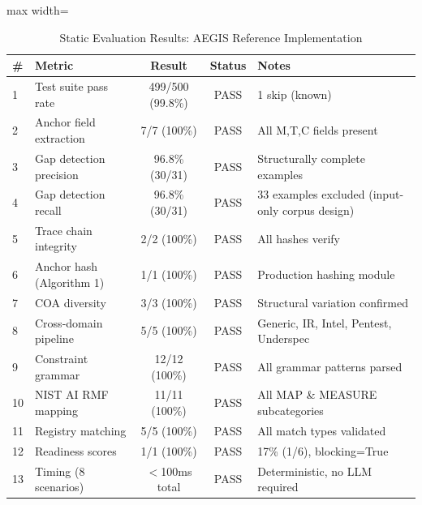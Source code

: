 \begin{table}[H]
\caption{Static Evaluation Results: AEGIS Reference Implementation}
\label{tab:static-eval}
\centering
\small
\begin{adjustbox}{max width=\textwidth}
\begin{tabular}{@{}llccl@{}}
\toprule
\textbf{\#} & \textbf{Metric} & \textbf{Result} & \textbf{Status} & \textbf{Notes} \\
\midrule
1  & Test suite pass rate         & 499/500 (99.8\%) & PASS & 1 skip (known) \\
2  & Anchor field extraction      & 7/7 (100\%)      & PASS & All M,T,C fields present \\
3  & Gap detection precision      & 96.8\% (30/31)   & PASS & Structurally complete examples \\
4  & Gap detection recall         & 96.8\% (30/31)   & PASS & 33 examples excluded (input-only corpus design) \\
5  & Trace chain integrity        & 2/2 (100\%)      & PASS & All hashes verify \\
6  & Anchor hash (Algorithm 1)    & 1/1 (100\%)      & PASS & Production hashing module \\
7  & COA diversity                & 3/3 (100\%)      & PASS & Structural variation confirmed \\
8  & Cross-domain pipeline        & 5/5 (100\%)      & PASS & Generic, IR, Intel, Pentest, Underspec \\
9  & Constraint grammar           & 12/12 (100\%)    & PASS & All grammar patterns parsed \\
10 & NIST AI RMF mapping          & 11/11 (100\%)    & PASS & All MAP \& MEASURE subcategories \\
11 & Registry matching            & 5/5 (100\%)      & PASS & All match types validated \\
12 & Readiness scores             & 1/1 (100\%)      & PASS & 17\% (1/6), blocking=True \\
13 & Timing (8 scenarios)         & $<$100ms total   & PASS & Deterministic, no LLM required \\
\bottomrule
\end{tabular}
\end{adjustbox}
\end{table}
